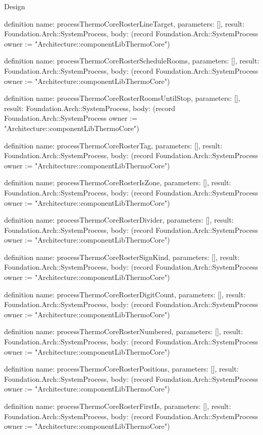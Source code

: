 \begin{lexlean}{Design}
\begin{semanticmodule}
definition{
  name: processThermoCoreRosterLineTarget,
  parameters: [],
  result: Foundation.Arch::SystemProcess,
  body: (record Foundation.Arch::SystemProcess {owner := "Architecture::componentLibThermoCore"})
}

definition{
  name: processThermoCoreRosterScheduleRooms,
  parameters: [],
  result: Foundation.Arch::SystemProcess,
  body: (record Foundation.Arch::SystemProcess {owner := "Architecture::componentLibThermoCore"})
}

definition{
  name: processThermoCoreRosterRoomsUntilStop,
  parameters: [],
  result: Foundation.Arch::SystemProcess,
  body: (record Foundation.Arch::SystemProcess {owner := "Architecture::componentLibThermoCore"})
}

definition{
  name: processThermoCoreRosterTag,
  parameters: [],
  result: Foundation.Arch::SystemProcess,
  body: (record Foundation.Arch::SystemProcess {owner := "Architecture::componentLibThermoCore"})
}

definition{
  name: processThermoCoreRosterIsZone,
  parameters: [],
  result: Foundation.Arch::SystemProcess,
  body: (record Foundation.Arch::SystemProcess {owner := "Architecture::componentLibThermoCore"})
}

definition{
  name: processThermoCoreRosterDivider,
  parameters: [],
  result: Foundation.Arch::SystemProcess,
  body: (record Foundation.Arch::SystemProcess {owner := "Architecture::componentLibThermoCore"})
}

definition{
  name: processThermoCoreRosterSignKind,
  parameters: [],
  result: Foundation.Arch::SystemProcess,
  body: (record Foundation.Arch::SystemProcess {owner := "Architecture::componentLibThermoCore"})
}

definition{
  name: processThermoCoreRosterDigitCount,
  parameters: [],
  result: Foundation.Arch::SystemProcess,
  body: (record Foundation.Arch::SystemProcess {owner := "Architecture::componentLibThermoCore"})
}

definition{
  name: processThermoCoreRosterNumbered,
  parameters: [],
  result: Foundation.Arch::SystemProcess,
  body: (record Foundation.Arch::SystemProcess {owner := "Architecture::componentLibThermoCore"})
}

definition{
  name: processThermoCoreRosterPositions,
  parameters: [],
  result: Foundation.Arch::SystemProcess,
  body: (record Foundation.Arch::SystemProcess {owner := "Architecture::componentLibThermoCore"})
}

definition{
  name: processThermoCoreRosterFirstIs,
  parameters: [],
  result: Foundation.Arch::SystemProcess,
  body: (record Foundation.Arch::SystemProcess {owner := "Architecture::componentLibThermoCore"})
}


\end{semanticmodule}
\end{lexlean}

